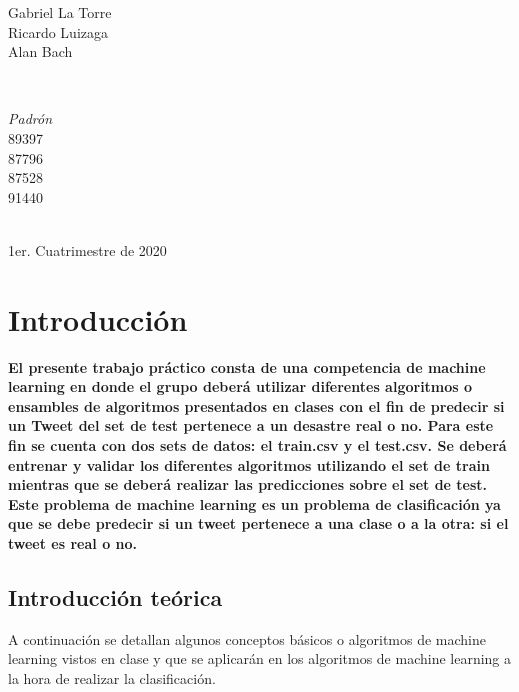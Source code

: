 \documentclass[12pt]{article}
\begin{document}
\begin{titlepage}
\begin{minipage}{0.4\textwidth}
\begin{flushleft}
            Gabriel La Torre\\
        	Ricardo Luizaga\\
        	Alan Bach\\
        \end{flushleft}
	\end{minipage}~
    \begin{minipage}{0.18\textwidth}
		\begin{center} \large
          \emph{Padrón} \\ 
          89397\\
          87796\\
          87528\\
          91440
        \end{center}
	\end{minipage}~\\[2 cm]
    \normalsize{1er. Cuatrimestre de 2020} \\
\end{titlepage}


\tableofcontents
\pagebreak

\newpage
\section{Introducción}

\textbf{
El presente trabajo práctico consta de una competencia de machine learning en donde el grupo deberá utilizar diferentes algoritmos o ensambles de algoritmos presentados en clases con el fin de predecir si un Tweet del set de test pertenece a un desastre real o no.
Para este fin se cuenta con dos sets de datos: el train.csv y el test.csv. Se deberá entrenar y validar los diferentes algoritmos utilizando el set de train mientras que se deberá realizar las predicciones sobre el set de test.
Este problema de machine learning es un problema de clasificación ya que se debe predecir si un tweet pertenece a una clase o a la otra: si el tweet es real o no.
}

\subsection{Introducción teórica}
A continuación se detallan algunos conceptos básicos o algoritmos de machine learning vistos en clase y que se aplicarán en los algoritmos de machine learning a la hora de realizar la clasificación.
\end{document}
